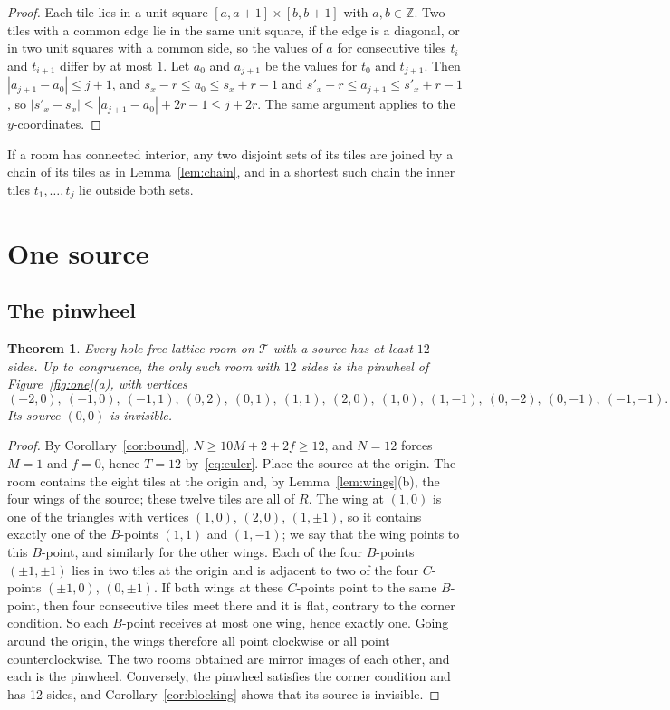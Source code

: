\documentclass[11pt,a4paper]{article}
\theoremstyle{plain}
\newtheorem{theorem}{Theorem}[section]
\theoremstyle{definition}
\theoremstyle{remark}
\newcommand{\Z}{\mathbb{Z}}
\newcommand{\T}{\mathcal{T}}
\numberwithin{equation}{section}
\begin{document}
\begin{proof}
Each tile lies in a unit square $[a,a+1]\times[b,b+1]$ with $a,b\in\Z$. Two tiles with a common edge lie in the same unit square, if the edge is a diagonal, or in two unit squares with a common side, so the values of $a$ for consecutive tiles $t_i$ and $t_{i+1}$ differ by at most $1$. Let $a_0$ and $a_{j+1}$ be the values for $t_0$ and $t_{j+1}$. Then $|a_{j+1}-a_0|\le j+1$, and $s_x-r\le a_0\le s_x+r-1$ and $s'_x-r\le a_{j+1}\le s'_x+r-1$, so $|s'_x-s_x|\le|a_{j+1}-a_0|+2r-1\le j+2r$. The same argument applies to the $y$-coordinates.
\end{proof}

If a room has connected interior, any two disjoint sets of its tiles are joined by a chain of its tiles as in Lemma~\ref{lem:chain}, and in a shortest such chain the inner tiles $t_1,\dots,t_j$ lie outside both sets.

\section{One source}\label{sec:one}

\subsection{The pinwheel}\label{sec:pinwheel}
\begin{theorem}\label{thm:pinwheel}
Every hole-free lattice room on $\T$ with a source has at least $12$ sides. Up to congruence, the only such room with $12$ sides is the \emph{pinwheel} of Figure~\textup{\ref{fig:one}(a)}, with vertices
\[
(-2,0),\ (-1,0),\ (-1,1),\ (0,2),\ (0,1),\ (1,1),\ (2,0),\ (1,0),\ (1,-1),\ (0,-2),\ (0,-1),\ (-1,-1).
\]
Its source $(0,0)$ is invisible.
\end{theorem}

\begin{proof}
By Corollary~\ref{cor:bound}, $N\ge10M+2+2f\ge12$, and $N=12$ forces $M=1$ and $f=0$, hence $T=12$ by~\eqref{eq:euler}. Place the source at the origin. The room contains the eight tiles at the origin and, by Lemma~\ref{lem:wings}(b), the four wings of the source; these twelve tiles are all of $R$. The wing at $(1,0)$ is one of the triangles with vertices $(1,0)$, $(2,0)$, $(1,\pm1)$, so it contains exactly one of the $B$-points $(1,1)$ and $(1,-1)$; we say that the wing points to this $B$-point, and similarly for the other wings. Each of the four $B$-points $(\pm1,\pm1)$ lies in two tiles at the origin and is adjacent to two of the four $C$-points $(\pm1,0)$, $(0,\pm1)$. If both wings at these $C$-points point to the same $B$-point, then four consecutive tiles meet there and it is flat, contrary to the corner condition. So each $B$-point receives at most one wing, hence exactly one. Going around the origin, the wings therefore all point clockwise or all point counterclockwise. The two rooms obtained are mirror images of each other, and each is the pinwheel. Conversely, the pinwheel satisfies the corner condition and has 12 sides, and Corollary~\ref{cor:blocking} shows that its source is invisible.
\end{proof}
\end{document}
